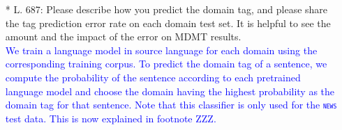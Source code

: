 \documentclass[12pt,times,a4paper,twoside]{article}
\newcommand{\fyTodo}[1]{\Todo[FY:]{\textcolor{orange}{#1}}}
\theoremstyle{definition}
\newcommand{\domain}[1]{\texttt{\textsc{#1}}}
\begin{document}
\begin{itemize}
\item[*] L. 687: Please describe how you predict the domain tag, and please share the tag prediction error rate on each domain test set. It is helpful to see the amount and the impact of the error on MDMT results.
\\
\textcolor{blue}{We train a language model in source language for each domain using the corresponding training corpus. To predict the domain tag of a sentence, we compute the probability of the sentence according to each pretrained language model and choose the domain having the highest probability as the domain tag for that sentence. Note that this classifier is only used for the \domain{news} test data. This is now explained in footnote ZZZ.}\fyTodo{to compute error rate of domain prediction over each test set, check comment, add footnote number.}
\end{itemize}
\end{document}
